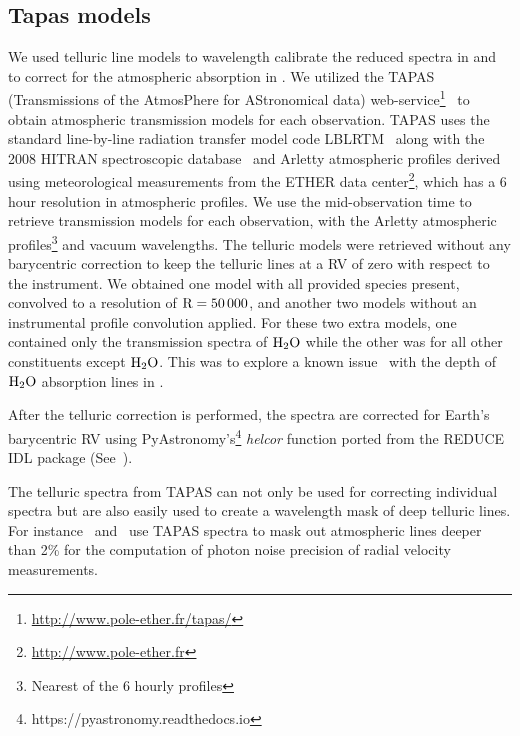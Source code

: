 \subsection{Tapas models}
\label{subsec:tapas_models}
We used telluric line models to wavelength calibrate the reduced spectra in  and to correct for the atmospheric absorption in . We utilized the TAPAS (Transmissions of the AtmosPhere for AStronomical data) web-service\footnote{\url{http://www.pole-ether.fr/tapas/}}~\citep{bertaux_tapas_2014} to obtain atmospheric transmission models for each observation. TAPAS uses the standard line-by-line radiation transfer model code LBLRTM~\citep{clough_linebyline_1995} along with the 2008 HITRAN spectroscopic database~\citep{rothman_hitran_2009} and Arletty atmospheric profiles derived using meteorological measurements from the ETHER data center\footnote{\url{http://www.pole-ether.fr}}, which has a 6 hour resolution in atmospheric profiles.
We use the mid-observation time to retrieve transmission models for each observation, with the Arletty atmospheric profiles\footnote{Nearest of the 6 hourly profiles} and vacuum wavelengths. The telluric models were retrieved without any barycentric correction to keep the telluric lines at a RV of zero with respect to the instrument. We obtained one model with all provided species present, convolved to a resolution of \(\rm R=50\,000 \), and another two models without an instrumental profile convolution applied. For these two extra models, one contained only the transmission spectra of \(\rm H_{2}O \) while the other was for all other constituents except \(\rm H_{2}O \). This was to explore a known issue~\citep{bertaux_tapas_2014} with the depth of \(\rm H_{2}O \) absorption lines in .

After the telluric correction is performed, the spectra are corrected for Earth's barycentric RV using PyAstronomy's\footnote{https://pyastronomy.readthedocs.io} \emph{helcor} function ported from the REDUCE IDL package (See~\citet[][]{piskunov_new_2002}).



The telluric spectra from TAPAS can not only be used for correcting individual spectra but are also easily used to create a wavelength mask of deep telluric lines. For instance~\citet{figueira_radial_2016} and~\citet{artigau_optical_2018} use TAPAS spectra to mask out atmospheric lines deeper than 2\% for the computation of photon noise precision of radial velocity measurements. 



